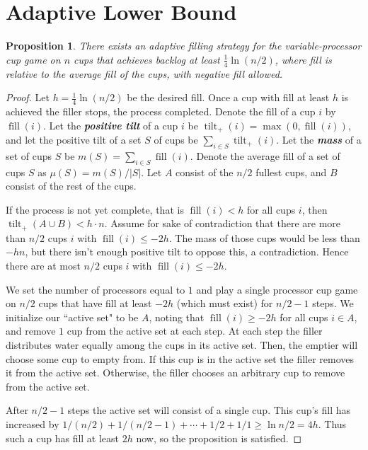 \documentclass[twocolumn]{article}[11pt]
\newcommand{\defn}[1]{{\textit{\textbf{\boldmath #1}}}}
\DeclareMathOperator{\tilt}{\text{tilt}}
\DeclareMathOperator{\fil}{\text{fill}}
\newtheorem{proposition}{Proposition}
\begin{document}
\section{Adaptive Lower Bound}\label{sec:adaptive}
\begin{proposition}
\label{prop:adaptiveBase}
  There exists an adaptive filling strategy for the variable-processor cup game
  on $n$ cups that achieves backlog at least $\frac{1}{4}\ln (n/2)$, where fill
  is relative to the average fill of the cups, with negative fill allowed.
\end{proposition}
\begin{proof}
  Let $h = \frac{1}{4}\ln (n/2)$ be the desired fill. Once a cup with fill at
  least $h$ is achieved the filler stops, the process completed. Denote the
  fill of a cup $i$ by $\fil(i)$. Let the \defn{positive tilt} of a cup $i$ be
  $\tilt_+(i) = \max(0, \fil(i))$, and let the positive tilt of a set $S$ of
  cups be $\sum_{i\in S} \tilt_+(i)$. Let the \defn{mass} of a set of cups $S$
  be $m(S) = \sum_{i\in S} \fil(i)$. Denote the average fill of a set of cups $S$ as 
  $\mu(S) = m(S) / |S|$. Let $A$ consist of the $n/2$ fullest cups, and
  $B$ consist of the rest of the cups.

  If the process is not yet complete, that is $\fil(i) < h$ for all cups $i$,
  then $\tilt_+(A\cup B) < h\cdot n$. Assume for
  sake of contradiction that there are more than $n/2$ cups $i$ with $\fil(i)
  \le -2h$. The mass of those cups would be less than $-hn $, but there isn't
  enough positive tilt to oppose this, a contradiction. Hence there are at most
  $n/2$ cups $i$ with $\fil(i) \le -2h$. 

  We set the number of processors equal to $1$ and play a single processor cup
  game on $n/2$ cups that have fill at least $-2h$ (which must exist) for $n/2
  -1$ steps. We initialize our ``active set" to be $A$, noting that $\fil(i)
  \ge -2h$ for all cups $i\in A$, and remove $1$ cup from the active set at
  each step.
  At each step the filler distributes water equally among the cups in its
  active set. Then, the emptier will choose some cup to empty from. If this cup
  is in the active set the filler removes it from the active set. Otherwise, the
  filler chooses an arbitrary cup to remove from the active set.

  After $n/2-1$ steps the active set will consist of a single cup. This cup's
  fill has increased by $1/(n/2) + 1/(n/2 - 1) + \cdots + 1/2 + 1/1
  \ge \ln n/2 = 4h$. Thus such a cup has fill at least $2h$ now, so the
  proposition is satisfied.
\end{proof}
\end{document}

